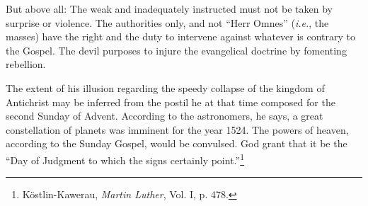 But above all: The weak and inadequately instructed must not be taken by
surprise or violence. The authorities only, and not “Herr Omnes” (\textit{i.e.}, the
masses) have the right and the duty to intervene against whatever is contrary
to the Gospel. The devil purposes to injure the evangelical doctrine by fomenting rebellion.

The extent of his illusion regarding the speedy collapse of the
kingdom of Antichrist may be inferred from the postil he at that
time composed for the second Sunday of Advent. According to the
astronomers, he says, a great constellation of planets was imminent
for the year 1524. The powers of heaven, according to the Sunday
Gospel, would be convulsed. God grant that it be the “Day of Judgment to
which the signs certainly point.”\footnote{Köstlin-Kawerau, \textit{Martin Luther}, Vol. I, p. 478.}

